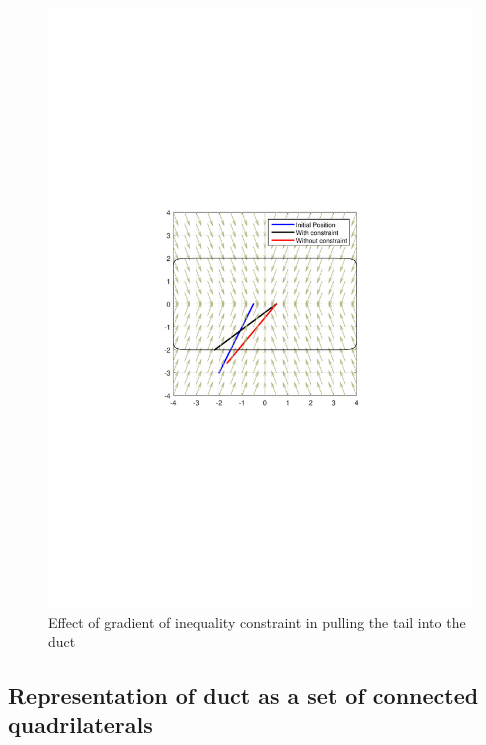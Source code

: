 \documentclass[12pt,a4]{article}
\begin{document}
\begin{figure}[h]
\centering
\includegraphics[scale=0.5]{figures/fig6.pdf}
\caption{ Effect of gradient of inequality constraint in pulling the tail into the duct\label{fig:gradienteffectSE}}
\end{figure}


\subsection{Representation of duct as a set of connected quadrilaterals}
\end{document}
